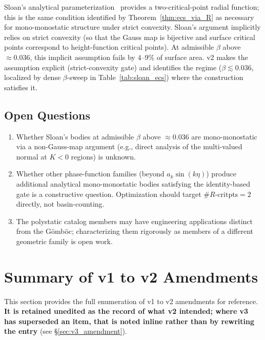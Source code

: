 \documentclass[11pt,a4paper]{article}
\begin{document}
Sloan's analytical parameterization~\cite{sloan2023} provides a
two-critical-point radial function; this is the same condition
identified by Theorem~\ref{thm:ecs_via_R} as necessary for
mono-monostatic structure under strict convexity. Sloan's argument
implicitly relies on strict convexity (so that the Gauss map is
bijective and surface critical points correspond to height-function
critical points). At admissible $\beta$ above $\approx 0.036$, this
implicit assumption fails by $4$--$9\%$ of surface area. v2 makes
the assumption explicit (strict-convexity gate) and identifies
the regime ($\beta \lesssim 0.036$, localized by dense
$\beta$-sweep in Table~\ref{tab:sloan_ecs}) where the construction
satisfies it.

\subsection{Open Questions}

\begin{enumerate}[nosep]
\item Whether Sloan's bodies at admissible $\beta$ above
  $\approx 0.036$ are mono-monostatic via a non-Gauss-map argument (e.g., direct analysis of the
  multi-valued normal at $K < 0$ regions) is unknown.
\item Whether other phase-function families (beyond
  $a_k \sin(k\eta)$) produce additional analytical mono-monostatic
  bodies satisfying the identity-based gate is a constructive
  question. Optimization should target $\#R\text{-critpts} = 2$
  directly, not basin-counting.
\item The polystatic catalog members may have engineering
  applications distinct from the G\"omb\"oc; characterizing them
  rigorously as members of a different geometric family is open
  work.
\end{enumerate}

\section{Summary of v1 to v2 Amendments}
\label{sec:amendment_summary}

This section provides the full enumeration of v1 to v2 amendments
for reference. \textbf{It is retained unedited as the record of what
v2 intended; where v3 has superseded an item, that is noted inline
rather than by rewriting the entry} (see
\S\ref{sec:v3_amendment}).
\end{document}
